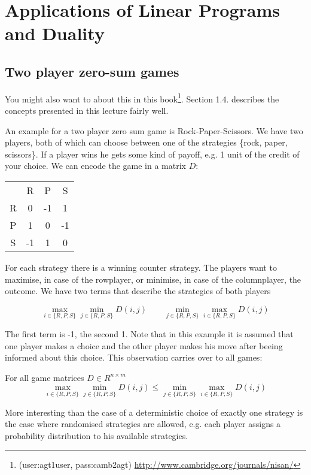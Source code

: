 \section{Applications of Linear Programs and Duality}
\subsection{Two player zero-sum games}

You might also want to about this in this book\footnote{(user:agt1user, pass:camb2agt) \url{http://www.cambridge.org/journals/nisan/}}. Section 1.4. describes the concepts presented in this lecture fairly well.

An example for a two player zero sum game is Rock-Paper-Scissors. We have two players, both of which can choose between one of the strategies \{rock, paper, scissors\}. If a player wins he gets some kind of payoff, e.g. 1 unit of the credit of your choice. We can encode the game in a matrix $D$:

\begin{center}
\begin{tabular}{cccc}
 & R & P & S\\
R & 0 & -1 & 1\\
P & 1 & 0 & -1\\
S & -1 & 1 & 0\\
\end{tabular}
\end{center}

For each strategy there is a winning counter strategy. The players want to maximise, in case of the rowplayer, or minimise, in case of the columnplayer, the outcome. We have two terms that describe the strategies of both players

\[\max_{i\in \{R,P,S\}} \min_{j\in \{R,P,S\}} D(i,j) \qquad \min_{j\in \{R,P,S\}}\max_{i\in \{R,P,S\}} D(i,j)\]

The first term is -1, the second 1. Note that in this example it is assumed that one player makes a choice and the other player makes his move after beeing informed about this choice. This observation carries over to all games:

\begin{lem}\label{2pzsLemma1} For all game matrices $D\in R^{n\times m}$
\[\max_{i\in \{R,P,S\}} \min_{j\in \{R,P,S\}} D(i,j) \leq \min_{j\in \{R,P,S\}}\max_{i\in \{R,P,S\}} D(i,j)\]
\end{lem}

More interesting than the case of a deterministic choice of exactly one strategy is the case where randomised strategies are allowed, e.g. each player assigns a probability distribution to his available strategies.

